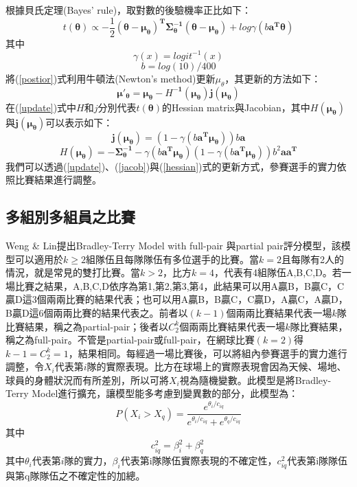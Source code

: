 \documentclass[12pt]{article}
\begin{document}
根據貝氏定理(Bayes' rule)，取對數的後驗機率正比如下：
\begin{equation}
t(\boldsymbol{\theta}) \propto - \dfrac{1}{2}\boldsymbol{(\theta-\mu_{\theta})^T\Sigma^{-1}_{\theta}(\theta - \mu_{\theta})} + log\gamma(b\boldsymbol{a^T\theta})
\label{postior}
\end{equation}
其中
\[
\gamma(x) =  logit^{-1}(x)
\]
\[
b = log(10)/400
\]
將(\ref{postior})式利用牛頓法(Newton's method)更新$\mu_{\theta}$，其更新的方法如下：
\begin{equation}
\boldsymbol{\mu'_{\theta}} = \boldsymbol{\mu_{\theta} - \textit{H}^{-1}(\mu_{\theta})j(\mu_{\theta})}
\label{update}
\end{equation}
在(\ref{update})式中$\textit{H}$和$j$分別代表$t(\boldsymbol{\theta})$的Hessian matrix與Jacobian，其中$\boldsymbol{\textit{H}(\mu_{\theta})}$與$\boldsymbol{j(\mu_{\theta})}$可以表示如下：
\begin{equation}
\boldsymbol{j(\mu_{\theta})} = (1-\gamma(b \boldsymbol{a^T \mu_{\theta}}))b \boldsymbol{a}
\label{jacob}
\end{equation}
\begin{equation}
\textit{H}(\boldsymbol{\mu_{\theta}}) = -\boldsymbol{\Sigma^{-1}_{\theta}} - \gamma(b \boldsymbol{a^T \mu_{\theta}})(1-\gamma(b \boldsymbol{a^T \mu_{\theta}}))b^2 \boldsymbol{aa^T}
\label{hessian}
\end{equation}
我們可以透過(\ref{update})、(\ref{jacob})與(\ref{hessian})式的更新方式，參賽選手的實力依照比賽結果進行調整。
\subsection{多組別多組員之比賽}
Weng \& Lin提出Bradley-Terry Model with full-pair 與partial pair\cite{JMLR:v12:weng11a}評分模型，該模型可以適用於$k \geq 2$組隊伍且每隊隊伍有多位選手的比賽。當$k = 2$且每隊有2人的情況，就是常見的雙打比賽。當$k > 2$，比方$k = 4$，代表有4組隊伍A,B,C,D。若一場比賽之結果，A,B,C,D依序為第1,第2,第3,第4，此結果可以用A贏B，B贏C，C贏D這3個兩兩比賽的結果代表；也可以用A贏B，B贏C，C贏D，A贏C，A贏D，B贏D這6個兩兩比賽的結果代表之。前者以$(k-1)$個兩兩比賽結果代表一場$k$隊比賽結果，稱之為partial-pair；後者以$C^k_2$個兩兩比賽結果代表一場$k$隊比賽結果，稱之為full-pair。不管是partial-pair或full-pair，在網球比賽$(k = 2)$得$k-1 = C^k_2 =1$，結果相同。每經過一場比賽後，可以將組內參賽選手的實力進行調整，令$X_i$代表第$i$隊的實際表現。比方在球場上的實際表現會因為天候、場地、球員的身體狀況而有所差別，所以可將$X_i$視為隨機變數。此模型是將Bradley-Terry Model進行擴充，讓模型能多考慮到變異數的部分，此模型為：
\begin{equation}
P(X_i > X_q) = \dfrac{e^{\theta_i/c_{iq}}}{e^{\theta_i/c_{iq}} +e^{\theta_q/c_{iq}}}
\end{equation}
其中
\[
c^2_{iq} = \beta^2_i + \beta^2_q\ 
\]
其中$\theta_i$代表第$i$隊的實力，$\beta_i$代表第i隊隊伍實際表現的不確定性，$c^2_{iq}$代表第i隊隊伍與第q隊隊伍之不確定性的加總。
\end{document}
